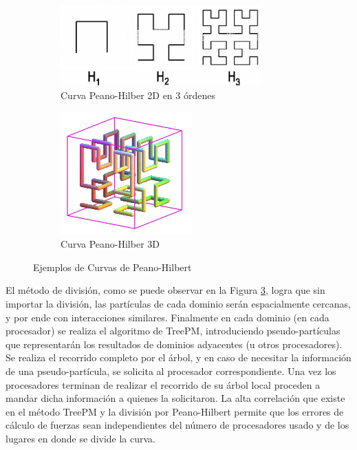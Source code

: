 \begin{figure}[H]
	\centering
	\begin{subfigure}[b]{0.48\textwidth}
		\includegraphics[width=0.85\textwidth]{MarcoTeorico/line_2}
		\caption[Curva Peano-Hilber 2D en 3 órdenes]{Curva Peano-Hilber 2D en 3 órdenes\footnotemark[4]}
		\label{fig:ph2d}
	\end{subfigure}
	\hfill
	\begin{subfigure}[b]{0.48\textwidth}
		\includegraphics[width=0.55\textwidth]{MarcoTeorico/hilbert3d01}
		\caption[Curva Peano-Hilber 3D]{Curva Peano-Hilber 3D\footnotemark[5]}
		\label{fig:ph3d}
	\end{subfigure}
	\caption{Ejemplos de Curvas de Peano-Hilbert}
	\label{fig:peanoh}
\end{figure}

El método de división, como se puede observar en la Figura \ref{fig:peanoh}, logra que sin importar la división, las partículas de cada dominio serán espacialmente cercanas, y por ende con interacciones similares. Finalmente en cada dominio (en cada procesador) se realiza el algoritmo de TreePM, introduciendo pseudo-partículas que representarán los resultados de dominios adyacentes (u otros procesadores). Se realiza el recorrido completo por el árbol, y en caso de necesitar la información de una pseudo-partícula, se solicita al procesador correspondiente. Una vez los procesadores terminan de realizar el recorrido de su árbol local proceden a mandar dicha información a quienes la solicitaron. La alta correlación que existe en el método TreePM y la división por Peano-Hilbert permite que los errores de cálculo de fuerzas sean independientes del número de procesadores usado y de los lugares en donde se divide la curva.